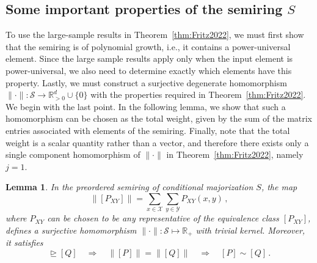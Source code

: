 \documentclass[aps,pra,11pt,onecolumn,nofootinbib,tightenlines]{revtex4-2}
\newtheorem{lemma}[theorem]{Lemma}
\theoremstyle{definition}
\newcommand{\cS}{\mathcal{S}}
\newcommand{\R}{\mathbb{R}}
\newcommand{\mc}[1]{\mathcal{#1}}
\newcommand{\rgeq}{\trianglerighteq}
\begin{document}
\subsection{Some important properties of the semiring $S$}
To use the large-sample results in Theorem~\ref{thm:Fritz2022}, we must first show that the semiring is of polynomial growth, i.e., it contains a power-universal element. Since the large sample results apply only when the input element is power-universal, we also need to determine exactly which elements have this property. Lastly, we must construct a surjective degenerate homomorphism $\|\cdot\|:\cS\to\R_{>0}^d\cup\{0\}$ with the properties required in Theorem~\ref{thm:Fritz2022}. We begin with the last point. In the following lemma, we show that such a homomorphism can be chosen as the total weight, given by the sum of the matrix entries associated with elements of the semiring. 
Finally, note that the total weight is a scalar quantity rather than a vector, and therefore there exists only a single component homomorphism of \(\|\cdot\|\) in Theorem~\ref{thm:Fritz2022}, namely \(j = 1\).
\begin{lemma}
\label{lem: degenerate and zig-zag}
In the preordered semiring of conditional majorization $S$, the map
\begin{equation}
\|[P_{XY}]\| = \sum_{x\in\mc X}\sum_{y\in\mc Y} P_{XY}(x,y) \,,
\end{equation}
where $P_{XY}$ can be chosen to be any representative of the equivalence class $[P_{XY}]$,
defines a surjective homomorphism $\|\cdot\| : \cS \mapsto \mathbb{R}_+$ with trivial kernel. Moreover, it satisfies
\begin{equation}
[P] \rgeq [Q] \quad \Rightarrow \quad \|[P]\| = \|[Q]\| \quad \Rightarrow\quad  [P] \sim [Q]\,.
\end{equation}
\end{lemma}
\end{document}
